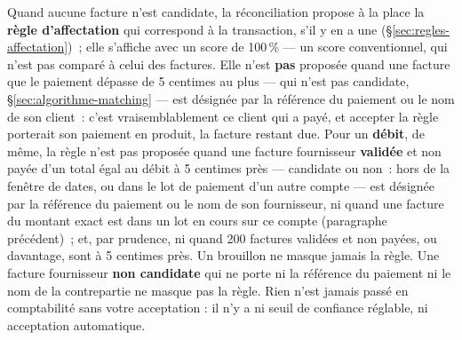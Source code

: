 \documentclass[a4paper,11pt,oneside]{article}
\begin{document}
Quand aucune facture n'est candidate, la réconciliation propose à la place la \textbf{règle d'affectation} qui correspond à la transaction, s'il y en a une (\S\ref{sec:regles-affectation})~; elle s'affiche avec un score de 100\,\% --- un score conventionnel, qui n'est pas comparé à celui des factures. Elle n'est \textbf{pas} proposée quand une facture que le paiement dépasse de 5 centimes au plus --- qui n'est pas candidate, \S\ref{sec:algorithme-matching} --- est désignée par la référence du paiement ou le nom de son client~: c'est vraisemblablement ce client qui a payé, et accepter la règle porterait son paiement en produit, la facture restant due. Pour un \textbf{débit}, de même, la règle n'est pas proposée quand une facture fournisseur \textbf{validée} et non payée d'un total égal au débit à 5 centimes près --- candidate ou non~: hors de la fenêtre de dates, ou dans le lot de paiement d'un autre compte --- est désignée par la référence du paiement ou le nom de son fournisseur, ni quand une facture du montant exact est dans un lot en cours sur ce compte (paragraphe précédent)~; et, par prudence, ni quand 200 factures validées et non payées, ou davantage, sont à 5 centimes près. Un brouillon ne masque jamais la règle. Une facture fournisseur \textbf{non candidate} qui ne porte ni la référence du paiement ni le nom de la contrepartie ne masque pas la règle. Rien n'est jamais passé en comptabilité sans votre acceptation : il n'y a ni seuil de confiance réglable, ni acceptation automatique.
\end{document}
